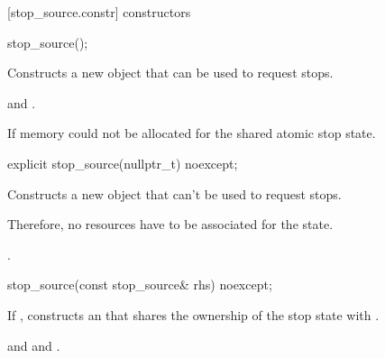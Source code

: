 {%
[stop_source.constr]{ constructors}

%
\begin{itemdecl}
stop_source();
\end{itemdecl}
\begin{itemdescr}
  \pnum\effects Constructs a new  object that can be used to request stops.
  
  \pnum\postconditions {} and .

  \pnum\throws {} If memory could not be allocated for the shared atomic stop state.
\end{itemdescr}

%
\begin{itemdecl}
explicit stop_source(nullptr_t) noexcept;
\end{itemdecl}
\begin{itemdescr}
  \pnum\effects Constructs a new  object that can't be used to request stops.
                \begin{note} Therefore, no resources have to be associated for the state.  \end{note}

  \pnum\postconditions {}.
\end{itemdescr}


%
\begin{itemdecl}
stop_source(const stop_source& rhs) noexcept;
\end{itemdecl}
\begin{itemdescr}
  \pnum\effects If ,
                constructs an 
                that shares the ownership of the stop state with .

  \pnum\postconditions {}
                and 
                and .
\end{itemdescr}

}

